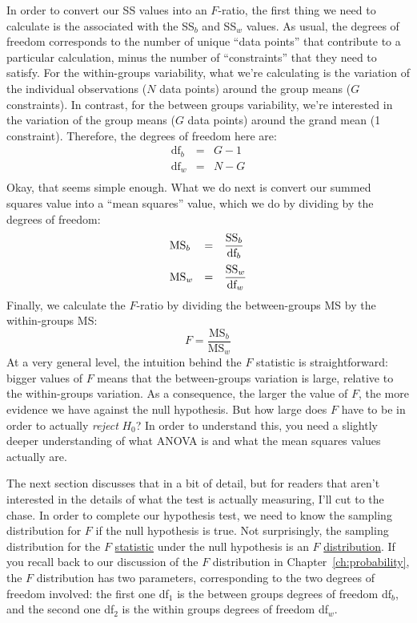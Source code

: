 In order to convert our SS values into an $F$-ratio, the first thing we need to calculate is the  associated with the SS$_b$ and SS$_w$ values. As usual, the degrees of freedom corresponds to the number of unique ``data points'' that contribute to a particular calculation, minus the number of ``constraints'' that they need to satisfy. For the within-groups variability, what we're calculating is the variation of the individual observations ($N$ data points) around the group means ($G$ constraints). In contrast, for the between groups variability, we're interested in the variation of the group means ($G$ data points) around the grand mean (1 constraint). Therefore, the degrees of freedom here are:
$$
\begin{array}{lcl}
\mbox{df}_b &=& G-1 \\
\mbox{df}_w &=& N-G \\
\end{array}
$$
Okay, that seems simple enough. What we do next is convert our summed squares value into a ``mean squares'' value, which we do by dividing by the degrees of freedom: 
$$
\begin{array}{lcl}
\mbox{MS}_b &=& \displaystyle\frac{\mbox{SS}_b }{ \mbox{df}_b} \vspace*{6pt} \\
\mbox{MS}_w &=& \displaystyle\frac{\mbox{SS}_w }{ \mbox{df}_w} 
\end{array}
$$
Finally, we calculate the $F$-ratio by dividing the between-groups MS by the within-groups MS:
$$
F = \frac{\mbox{MS}_b }{ \mbox{MS}_w } 
$$
At a very general level, the intuition behind the $F$ statistic is straightforward: bigger values of $F$ means that the between-groups variation is large, relative to the within-groups variation. As a consequence, the larger the value of $F$, the more evidence we have against the null hypothesis. But how large does $F$ have to be in order to actually {\it reject} $H_0$? In order to understand this, you need a slightly deeper understanding of what ANOVA is and what the mean squares values actually are. 

The next section discusses that in a bit of detail, but for readers that aren't interested in the details of what the test is actually measuring, I'll cut to the chase. In order to complete our hypothesis test, we need to know the sampling distribution for $F$ if the null hypothesis is true. Not surprisingly, the sampling distribution for the $F$ \underline{statistic} under the null hypothesis is an $F$ \underline{distribution}. If you recall back to our discussion of the $F$ distribution in Chapter~\ref{ch:probability}, the $F$ distribution has two parameters, corresponding to the two degrees of freedom involved: the first one df$_1$ is the between groups degrees of freedom df$_b$, and the second one df$_2$ is the within groups degrees of freedom df$_w$. 

